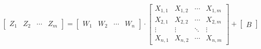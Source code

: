 \[
\begin{bmatrix}
Z_{1} & Z_{2} & \cdots & Z_{m}
\end{bmatrix}
=
\begin{bmatrix}
W_{1} & W_{2} & \cdots & W_{n}
\end{bmatrix}
\cdot
\begin{bmatrix}
X_{1,1} & X_{1,2} & \cdots & X_{1,m} \\
X_{2,1} & X_{2,2} & \cdots & X_{2,m} \\
\vdots & \vdots & \ddots & \vdots \\
X_{n,1} & X_{n,2} & \cdots & X_{n,m}
\end{bmatrix}
+
\begin{bmatrix}
B
\end{bmatrix}
\]
